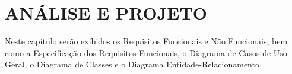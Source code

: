 
\section{ANÁLISE E PROJETO}
\label{chap:analise}
Neste capítulo serão exibidos os Requisitos Funcionais e Não Funcionais, bem como a Especificação dos Requisitos Funcionais, o Diagrama de Casos de Uso Geral, o Diagrama de Classes e o Diagrama Entidade-Relacionamento.


\clearpage


\clearpage


\clearpage


\clearpage


\clearpage


\clearpage


\clearpage


\clearpage